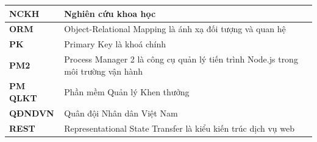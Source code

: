\documentclass[../DoAn.tex]{subfiles}
\begin{document}
\begin{longtable}{|>{\centering\arraybackslash}p{3.2cm}|R{10.8cm}|}
\textbf{NCKH}     & Nghiên cứu khoa học \\ \hline
\textbf{ORM}      & Object-Relational Mapping là ánh xạ đối tượng và quan hệ \\ \hline
\textbf{PK}       & Primary Key là khoá chính \\ \hline
\textbf{PM2}      & Process Manager 2 là công cụ quản lý tiến trình Node.js trong môi trường vận hành \\ \hline
\textbf{PM QLKT}  & Phần mềm Quản lý Khen thưởng \\ \hline
\textbf{QĐNDVN}   & Quân đội Nhân dân Việt Nam \\ \hline
\textbf{REST}     & Representational State Transfer là kiểu kiến trúc dịch vụ web \\ \hline
\end{longtable}

\newpage
\begingroup
\singlespacing
\renewcommand{\arraystretch}{1.2}
\end{document}
